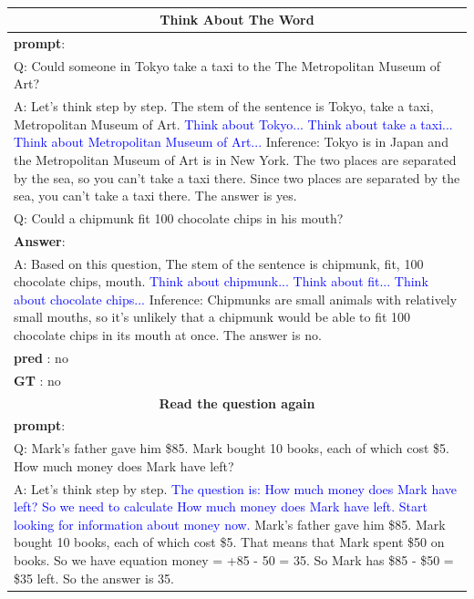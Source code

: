 \documentclass[11pt]{article}
\begin{document}
\label{sec:appendix}
%
\begin{table}[!h]
\small

\caption{}
  \label{wide_table1}
  
\begin{tabularx}{\textwidth}{X}
    \toprule
    \multicolumn{1}{c}{\textbf{Think About The Word}} \\\midrule
\textbf{prompt}: \\
Q: Could someone in Tokyo take a taxi to the The Metropolitan Museum of Art?\\
A: Let's think step by step. The stem of the sentence is Tokyo, take a taxi, Metropolitan Museum of Art. \textcolor{blue}{Think about Tokyo... Think about take a taxi... Think about Metropolitan Museum of Art...} Inference: Tokyo is in Japan and the Metropolitan Museum of Art is in New York. The two places are separated by the sea, so you can't take a taxi there. Since two places are separated by the sea, you can't take a taxi there. The answer is yes.  \\

Q: Could a chipmunk fit 100 chocolate chips in his mouth?\\\midrule
\textbf{Answer}:\\
A:
Based on this question, The stem of the sentence is chipmunk, fit, 100 chocolate chips, mouth. \textcolor{blue} {Think about chipmunk... Think about fit... Think about chocolate chips...} Inference: Chipmunks are small animals with relatively small mouths, so it's unlikely that a chipmunk would be able to fit 100 chocolate chips in its mouth at once. The answer is no.\\
\textbf{pred} : no\\
\textbf{GT} : no\\\toprule
    \multicolumn{1}{c}{\textbf{Read the question again}} \\\midrule
\textbf{prompt}: \\
Q: Mark's father gave him \$85. Mark bought 10 books, each of which cost \$5. How much money does Mark have left?\\
A: Let's think step by step. \textcolor{blue} {The question is: How much money does Mark have left? So we need to calculate How much money does Mark have left. Start looking for information about money now.} Mark's father gave him \$85. Mark bought 10 books, each of which cost \$5. That means that Mark spent \$50 on books. So we have equation money = +85 - 50 = 35. So Mark has \$85 - \$50 = \$35 left. So the answer is 35.\\


\end{tabularx}
\end{table}
\end{document}
